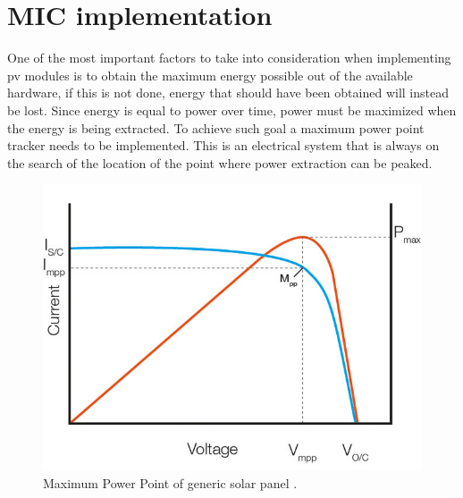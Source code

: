 
\section{MIC implementation}
One of the most important factors to take into consideration when implementing pv modules is to obtain the maximum energy possible out of the available hardware, if this is not done, energy that should have been obtained will instead be lost. Since energy is equal to power over time, power must be maximized when the energy is being extracted. To achieve such goal a maximum power point tracker needs to be implemented. This is an electrical system that is always on the search of the location of the point where power extraction can be peaked. 
\begin{figure}[htbp]
	\begin{center}
		\includegraphics[width=0.6\linewidth]{../Pictures/mpp_graph.jpg}
		\caption{Maximum Power Point of generic solar panel \cite{MICintro}.}
		\label{fig:mpp}
	\end{center}
\end{figure}


